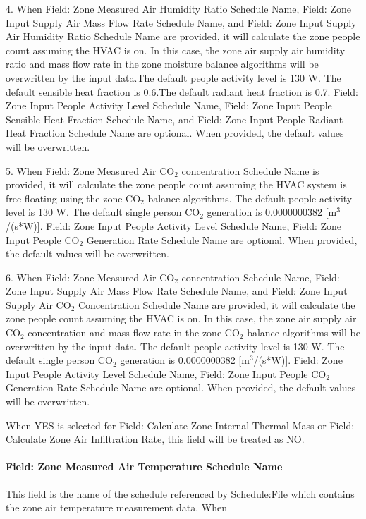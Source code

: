 4. When Field: Zone Measured Air Humidity Ratio Schedule Name, Field: Zone Input Supply Air Mass Flow Rate Schedule Name, and Field: Zone Input Supply Air Humidity Ratio Schedule Name are provided, it will calculate the zone people count assuming the HVAC is on. In this case, the zone air supply air humidity ratio and mass flow rate in the zone moisture balance algorithms will be overwritten by the input data.The default people activity level is 130 W. The default sensible heat fraction is 0.6.The default radiant heat fraction is 0.7. Field: Zone Input People Activity Level Schedule Name, Field: Zone Input People Sensible Heat Fraction Schedule Name, and Field: Zone Input People Radiant Heat Fraction Schedule Name are optional. When provided, the default values will be overwritten.

5. When Field: Zone Measured Air CO$_2$ concentration Schedule Name is provided, it will calculate the zone people count assuming the HVAC system is free-floating using the zone CO$_2$ balance algorithms. The default people activity level is 130 W. The default single person CO$_2$ generation is 0.0000000382 [m$^3$/(s*W)]. Field: Zone Input People Activity Level Schedule Name, Field: Zone Input People CO$_2$ Generation Rate Schedule Name are optional. When provided, the default values will be overwritten.

6. When Field: Zone Measured Air CO$_2$ concentration Schedule Name, Field: Zone Input Supply Air Mass Flow Rate Schedule Name, and Field: Zone Input Supply Air CO$_2$ Concentration Schedule Name are provided, it will calculate the zone people count assuming the HVAC is on. In this case, the zone air supply air CO$_2$ concentration and mass flow rate in the zone CO$_2$ balance algorithms will be overwritten by the input data. The default people activity level is 130 W. The default single person CO$_2$ generation is 0.0000000382 [m$^3$/(s*W)]. Field: Zone Input People Activity Level Schedule Name, Field: Zone Input People CO$_2$ Generation Rate Schedule Name are optional. When provided, the default values will be overwritten.

When YES is selected for Field: Calculate Zone Internal Thermal Mass or Field: Calculate Zone Air Infiltration Rate, this field will be treated as NO.

\paragraph{Field: Zone Measured Air Temperature Schedule Name}\label{field-zone-measured-air-temperature-schedule-name-hm}
This field is the name of the schedule referenced by Schedule:File which contains the zone air temperature measurement data. When

